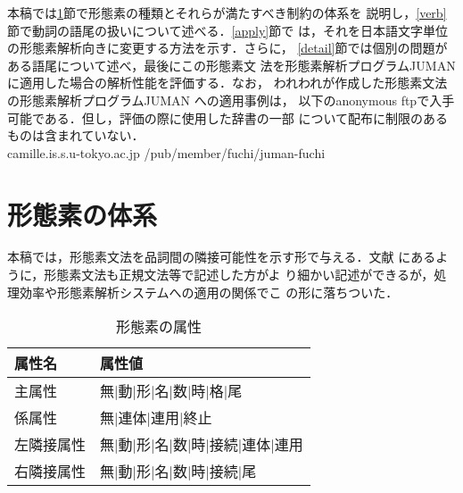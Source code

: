 本稿では\ref{system}節で形態素の種類とそれらが満たすべき制約の体系を
説明し，\ref{verb}節で動詞の語尾の扱いについて述べる．\ref{apply}節で
は，それを日本語文字単位の形態素解析向きに変更する方法を示す．さらに，
\ref{detail}節では個別の問題がある語尾について述べ，最後にこの形態素文
法を形態素解析プログラムJUMANに適用した場合の解析性能を評価する．なお，
われわれが作成した形態素文法の形態素解析プログラムJUMAN への適用事例は，
以下のanonymous ftpで入手可能である．但し，評価の際に使用した辞書の一部
について配布に制限のあるものは含まれていない．
\\ camille.is.s.u-tokyo.ac.jp  /pub/member/fuchi/juman-fuchi

\section{形態素の体系} \label{system}
本稿では，形態素文法を品詞間の隣接可能性を示す形で与える．文献
\cite{maruyama94}にあるように，形態素文法も正規文法等で記述した方がよ
り細かい記述ができるが，処理効率や形態素解析システムへの適用の関係でこ
の形に落ちついた．

\begin{table}
\begin{center}
\begin{tabular}{|l|l|}
\hline
属性名 & 属性値 \\
\hline
主属性 & 無$|$動$|$形$|$名$|$数$|$時$|$格$|$尾 \\
係属性 & 無$|$連体$|$連用$|$終止 \\
左隣接属性 & 無$|$動$|$形$|$名$|$数$|$時$|$接続$|$連体$|$連用 \\
右隣接属性 & 無$|$動$|$形$|$名$|$数$|$時$|$接続$|$尾 \\
\hline
\end{tabular}
\end{center}
\caption{形態素の属性}
\label{attribute}
\end{table}


